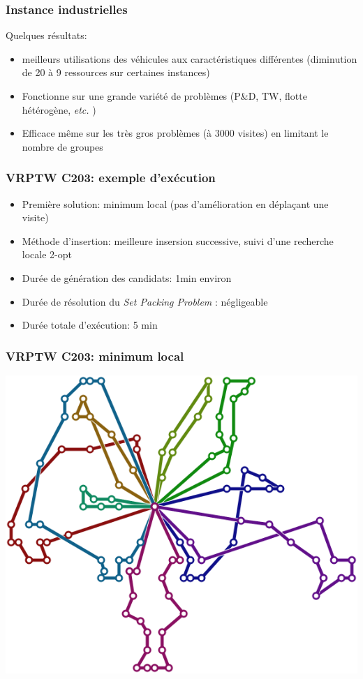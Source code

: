 \documentclass[table]{beamer}
\newcommand*{\foreign}[2][english]{%
    \emph{\foreignlanguage{#1}{#2}}%
}
\begin{document}
\begin{frame}
  \frametitle{Instance industrielles}

  Quelques résultats:
  \begin{itemize}
  \item meilleurs utilisations des véhicules aux caractéristiques
    différentes (diminution de 20 à 9 ressources sur certaines
    instances)
  \item Fonctionne sur une grande variété de problèmes (P\&D, TW,
    flotte hétérogène, \foreign{etc.})
  \item Efficace même sur les très gros problèmes (à 3000 visites) en
    limitant le nombre de groupes
  \end{itemize}
\end{frame}

\begin{frame}
  \frametitle{VRPTW C203: exemple d'exécution}

  \begin{itemize}
  \item Première solution: minimum local (pas d'amélioration en
    déplaçant une visite)
  \item Méthode d'insertion: meilleure insersion successive, suivi
    d'une recherche locale 2-opt
  \item Durée de génération des candidats: 1min environ
  \item Durée de résolution du \foreign{Set Packing Problem}: négligeable
  \item Durée totale d'exécution: 5 min
  \end{itemize}
\end{frame}

\begin{frame}
  \frametitle{VRPTW C203: minimum local}

  \centering
  \includegraphics[width=0.7\linewidth]{../article/images/C203-0}
\end{frame}
\end{document}
